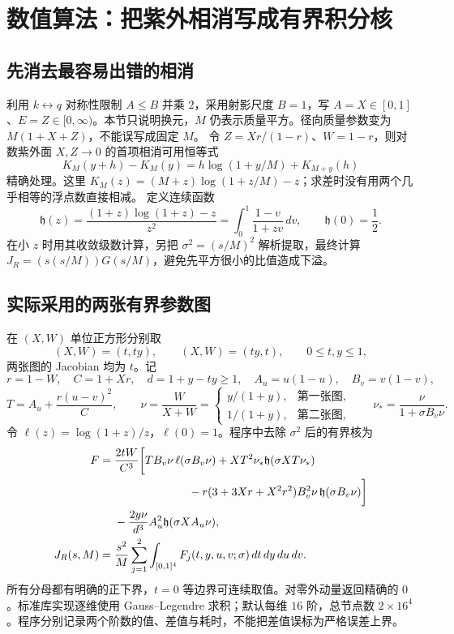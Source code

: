 \documentclass[UTF8,fontset=fandol,11pt]{ctexart}
\begin{document}
\clearpage
\section{数值算法：把紫外相消写成有界积分核}
\subsection{先消去最容易出错的相消}
利用 $k\leftrightarrow q$ 对称性限制 $A\leq B$ 并乘 $2$，采用射影尺度 $B=1$，写 $A=X\in[0,1]$、$E=Z\in[0,\infty)$。本节只说明换元，$M$ 仍表示质量平方。径向质量参数变为 $M(1+X+Z)$，不能误写成固定 $M$。
令 $Z=Xr/(1-r)$、$W=1-r$，则对数紫外面 $X,Z\to0$ 的首项相消可用恒等式
\[
 K_M(y+h)-K_M(y)
 =h\log(1+y/M)+K_{M+y}(h)
\]
精确处理。这里 $K_M(z)=(M+z)\log(1+z/M)-z$；求差时没有用两个几乎相等的浮点数直接相减。
定义连续函数
\[
 \mathfrak h(z)=\frac{(1+z)\log(1+z)-z}{z^2}
  =\int_0^1\frac{1-v}{1+zv}\,dv,\qquad \mathfrak h(0)=\frac12.
\]
在小 $z$ 时用其收敛级数计算，另把 $\sigma^2=(s/M)^2$ 解析提取，最终计算 $J_R=(s(s/M))G(s/M)$，避免先平方很小的比值造成下溢。

\subsection{实际采用的两张有界参数图}
在 $(X,W)$ 单位正方形分别取
\[
 (X,W)=(t,ty),\qquad (X,W)=(ty,t),
 \qquad 0\leq t,y\leq1,
\]
两张图的 Jacobian 均为 $t$。记
\[
 r=1-W,\quad C=1+Xr,\quad d=1+y-ty\geq1,
 \quad A_u=u(1-u),\quad B_v=v(1-v),
\]
\[
 T=A_u+\frac{r(u-v)^2}{C},\qquad
 \nu=\frac{W}{X+W}
 =\begin{cases}y/(1+y),&\text{第一张图},\\1/(1+y),&\text{第二张图},\end{cases}
 \qquad\nu_*=\frac{\nu}{1+\sigma B_v\nu}.
\]
令 $\ell(z)=\log(1+z)/z$，$\ell(0)=1$。程序中去除 $\sigma^2$ 后的有界核为
\begin{align}
 F={}&\frac{2tW}{C^3}\biggl[
 T B_v\nu\,\ell(\sigma B_v\nu)
 +XT^2\nu_*\mathfrak h(\sigma XT\nu_*)\notag\\
 &\hspace{23mm}-r(3+3Xr+X^2r^2)B_v^2\nu\,
                    \mathfrak h(\sigma B_v\nu)\biggr]\notag\\
 &-\frac{2y\nu}{d^3}A_u^2\mathfrak h(\sigma X A_u\nu),\\
 J_R(s,M)={}&\frac{s^2}{M}\sum_{j=1}^2\int_{[0,1]^4}F_j(t,y,u,v;\sigma)\,dt\,dy\,du\,dv.
\end{align}
所有分母都有明确的正下界，$t=0$ 等边界可连续取值。对零外动量返回精确的 $0$。标准库实现逐维使用 Gauss--Legendre 求积；默认每维 $16$ 阶，总节点数 $2\times16^4$。程序分别记录两个阶数的值、差值与耗时，不能把差值误标为严格误差上界。
\end{document}
